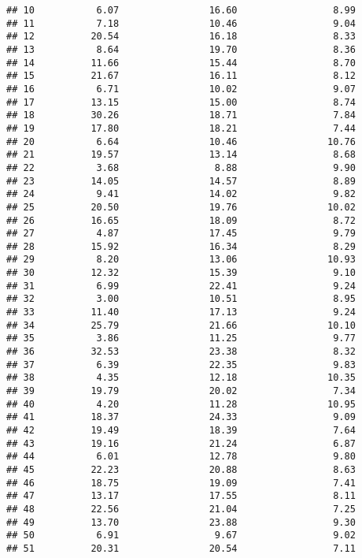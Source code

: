 \documentclass[
]{article}
\begin{document}
\begin{verbatim}
## 10           6.07                16.60                 8.99
## 11           7.18                10.46                 9.04
## 12          20.54                16.18                 8.33
## 13           8.64                19.70                 8.36
## 14          11.66                15.44                 8.70
## 15          21.67                16.11                 8.12
## 16           6.71                10.02                 9.07
## 17          13.15                15.00                 8.74
## 18          30.26                18.71                 7.84
## 19          17.80                18.21                 7.44
## 20           6.64                10.46                10.76
## 21          19.57                13.14                 8.68
## 22           3.68                 8.88                 9.90
## 23          14.05                14.57                 8.89
## 24           9.41                14.02                 9.82
## 25          20.50                19.76                10.02
## 26          16.65                18.09                 8.72
## 27           4.87                17.45                 9.79
## 28          15.92                16.34                 8.29
## 29           8.20                13.06                10.93
## 30          12.32                15.39                 9.10
## 31           6.99                22.41                 9.24
## 32           3.00                10.51                 8.95
## 33          11.40                17.13                 9.24
## 34          25.79                21.66                10.10
## 35           3.86                11.25                 9.77
## 36          32.53                23.38                 8.32
## 37           6.39                22.35                 9.83
## 38           4.35                12.18                10.35
## 39          19.79                20.02                 7.34
## 40           4.20                11.28                10.95
## 41          18.37                24.33                 9.09
## 42          19.49                18.39                 7.64
## 43          19.16                21.24                 6.87
## 44           6.01                12.78                 9.80
## 45          22.23                20.88                 8.63
## 46          18.75                19.09                 7.41
## 47          13.17                17.55                 8.11
## 48          22.56                21.04                 7.25
## 49          13.70                23.88                 9.30
## 50           6.91                 9.67                 9.02
## 51          20.31                20.54                 7.11

\end{verbatim}
\end{document}
